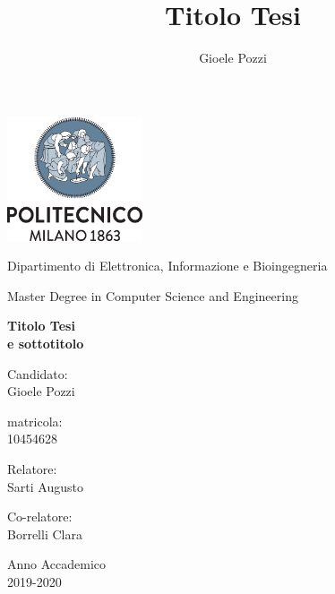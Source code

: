 \documentclass[oneside]{book}
\author{Gioele Pozzi}
\title{Titolo Tesi}
\begin{document}
\centering
\includegraphics[width=4cm]{../img/logo_polimi.png}

\vspace{1cm}
Dipartimento di Elettronica, Informazione e Bioingegneria

\vspace{0.25cm}
Master Degree in Computer Science and Engineering

\vspace{2cm}
\centering

\color{BrickRed}
\Huge
\textbf{
Titolo Tesi\\%
\Large e sottotitolo}

\normalsize
\vspace{2cm}
\color{black}
\flushright
Candidato:\\Gioele Pozzi

\vspace{0.5cm}
matricola:\\10454628

\vspace{0.5cm}
\flushleft
Relatore:\\ Sarti Augusto

\vspace{0.5cm}
Co-relatore:\\ Borrelli Clara



\vfill
\centering
Anno Accademico \\ 2019-2020

\end{document}

